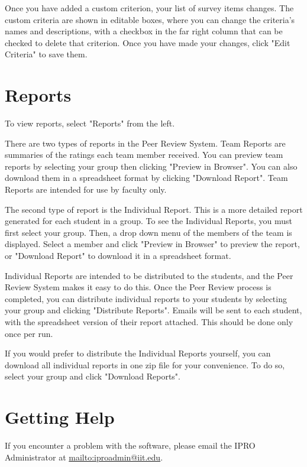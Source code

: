 \documentclass{article}
\begin{document}
Once you have added a custom criterion, your list of survey items changes. The custom criteria are shown in editable boxes, where you can change the criteria's names and descriptions, with a checkbox in the far right column that can be checked to delete that criterion. Once you have made your changes, click "Edit Criteria" to save them.

\section{Reports}

To view reports, select "Reports" from the left.

There are two types of reports in the Peer Review System. Team Reports are summaries of the ratings each team member received. You can preview team reports by selecting your group then clicking "Preview in Browser". You can also download them in a spreadsheet format by clicking "Download Report". Team Reports are intended for use by faculty only.

The second type of report is the Individual Report. This is a more detailed report generated for each student in a group. To see the Individual Reports, you must first select your group. Then, a drop down menu of the members of the team is displayed. Select a member and click "Preview in Browser" to preview the report, or "Download Report" to download it in a spreadsheet format.

Individual Reports are intended to be distributed to the students, and the Peer Review System makes it easy to do this. Once the Peer Review process is completed, you can distribute individual reports to your students by selecting your group and clicking "Distribute Reports". Emails will be sent to each student, with the spreadsheet version of their report attached. This should be done only once per run.

If you would prefer to distribute the Individual Reports yourself, you can download all individual reports in one zip file for your convenience. To do so, select your group and click "Download Reports".

\section{Getting Help}

If you encounter a problem with the software, please email the IPRO Administrator at \url{mailto:iproadmin@iit.edu}.
\end{document}
